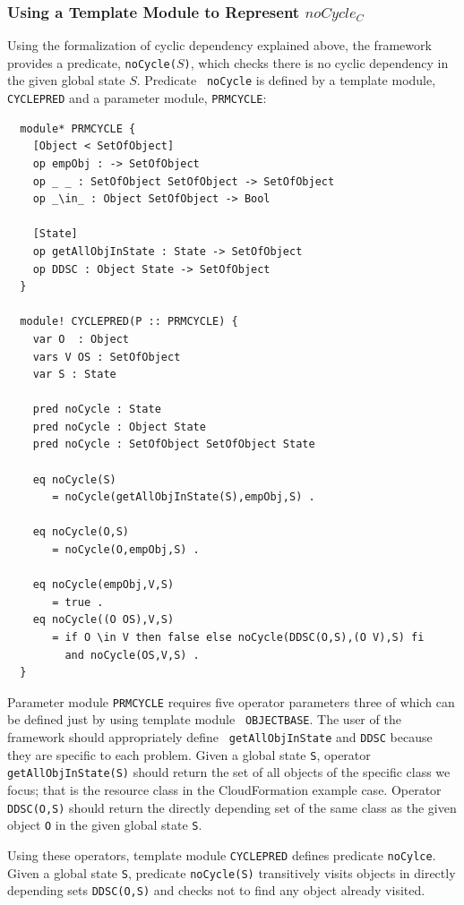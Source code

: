 \documentclass[12pt]{report}
\newcommand{\stt}[1]{{\small{\tt {#1}}}}
\begin{document}
\subsubsection{Using a Template Module to Represent $noCycle_C$}
Using the formalization of cyclic dependency explained above, the
framework provides a predicate, \stt{noCycle($S$)}, which checks there
is no cyclic dependency in the given global state $S$. Predicate {\tt
  noCycle} is defined by a template module, {\tt CYCLEPRED} and a
parameter module, {\tt PRMCYCLE}:
\small
\begin{verbatim}
  module* PRMCYCLE {
    [Object < SetOfObject]
    op empObj : -> SetOfObject
    op _ _ : SetOfObject SetOfObject -> SetOfObject
    op _\in_ : Object SetOfObject -> Bool
  
    [State]
    op getAllObjInState : State -> SetOfObject
    op DDSC : Object State -> SetOfObject
  }

  module! CYCLEPRED(P :: PRMCYCLE) {
    var O  : Object
    vars V OS : SetOfObject
    var S : State
  
    pred noCycle : State
    pred noCycle : Object State
    pred noCycle : SetOfObject SetOfObject State
  
    eq noCycle(S)
       = noCycle(getAllObjInState(S),empObj,S) .
  
    eq noCycle(O,S)
       = noCycle(O,empObj,S) .
  
    eq noCycle(empObj,V,S)
       = true .
    eq noCycle((O OS),V,S)
       = if O \in V then false else noCycle(DDSC(O,S),(O V),S) fi
         and noCycle(OS,V,S) .
  }
\end{verbatim}
\normalsize
Parameter module {\tt PRMCYCLE} requires five operator parameters
three of which can be defined just by using template module {\tt
  OBJECTBASE}.
The user of the framework should appropriately define {\tt
  getAllObjInState} and {\tt DDSC} because they are specific to each
problem. 
Given a global state {\tt S}, operator \stt{getAllObjInState(S)} should return
the set of all objects of the specific class we focus; that is the
resource class in the CloudFormation example case. Operator
\stt{DDSC(O,S)} should return the directly depending set of the same class
as the given object {\tt O} in the given global state {\tt S}.

Using these operators, template module {\tt CYCLEPRED} defines predicate
{\tt noCylce}. Given
a global state {\tt S}, predicate \stt{noCycle(S)} transitively visits objects in
directly depending sets \stt{DDSC(O,S)} and checks not to find any
object already visited.
\end{document}
